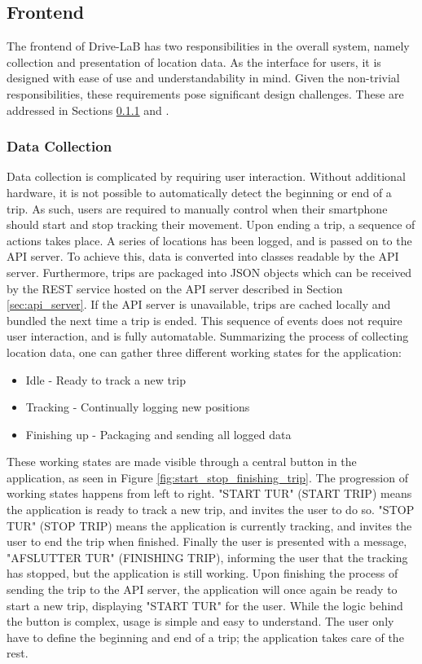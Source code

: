 \subsection{Frontend}\label{subsec:frontend_design}
The frontend of Drive-LaB has two responsibilities in the overall system, namely collection and presentation of location data. As the interface for users, it is designed with ease of use and understandability in mind. Given the non-trivial responsibilities, these requirements pose significant design challenges. These are addressed in Sections \ref{subsubsec:design_datacollection} and \label{subsubsec:design_datapresentation}.

\subsubsection{Data Collection}\label{subsubsec:design_datacollection}
Data collection is complicated by requiring user interaction. Without additional hardware, it is not possible to automatically detect the beginning or end of a trip. As such, users are required to manually control when their smartphone should start and stop tracking their movement.
Upon ending a trip, a sequence of actions takes place. A series of locations has been logged, and is passed on to the API server. To achieve this, data is converted into classes readable by the API server. Furthermore, trips are packaged into JSON objects which can be received by the REST service hosted on the API server described in Section \ref{sec:api_server}. If the API server is unavailable, trips are cached locally and bundled the next time a trip is ended. This sequence of events does not require user interaction, and is fully automatable. Summarizing the process of collecting location data, one can gather three different working states for the application:

\begin{itemize}
\item Idle - Ready to track a new trip
\item Tracking - Continually logging new positions
\item Finishing up - Packaging and sending all logged data
\end{itemize}

These working states are made visible through a central button in the application, as seen in Figure \ref{fig:start_stop_finishing_trip}. The progression of working states happens from left to right. "START TUR" (START TRIP) means the application is ready to track a new trip, and invites the user to do so. "STOP TUR" (STOP TRIP) means the application is currently tracking, and invites the user to end the trip when finished. Finally the user is presented with a message, "AFSLUTTER TUR" (FINISHING TRIP), informing the user that the tracking has stopped, but the application is still working. Upon finishing the process of sending the trip to the API server, the application will once again be ready to start a new trip, displaying "START TUR" for the user.
While the logic behind the button is complex, usage is simple and easy to understand. The user only have to define the beginning and end of a trip; the application takes care of the rest.

